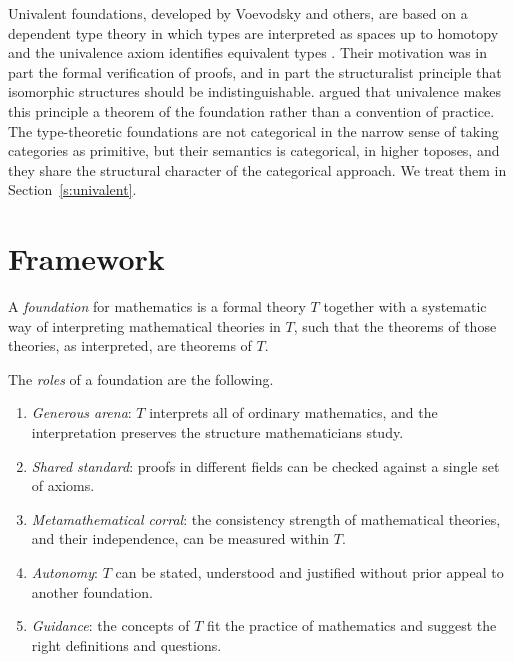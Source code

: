 \documentclass{situationist-preprint}
\begin{document}
Univalent foundations, developed by Voevodsky and others, are based on a dependent type theory in which types are interpreted as spaces up to homotopy and the univalence axiom identifies equivalent types \citep{UFP2013}. Their motivation was in part the formal verification of proofs, and in part the structuralist principle that isomorphic structures should be indistinguishable. \citet{Awodey2014} argued that univalence makes this principle a theorem of the foundation rather than a convention of practice. The type-theoretic foundations are not categorical in the narrow sense of taking categories as primitive, but their semantics is categorical, in higher toposes, and they share the structural character of the categorical approach. We treat them in Section~\ref{s:univalent}.

\section{Framework}\label{s:framework}

\begin{definition}\label{d:foundation}
A \emph{foundation} for mathematics is a formal theory $T$ together with a systematic way of interpreting mathematical theories in $T$, such that the theorems of those theories, as interpreted, are theorems of $T$.
\end{definition}

\begin{definition}\label{d:roles}
The \emph{roles} of a foundation are the following.
\begin{enumerate}[label=(\alph*)]
\item \emph{Generous arena}: $T$ interprets all of ordinary mathematics, and the interpretation preserves the structure mathematicians study.
\item \emph{Shared standard}: proofs in different fields can be checked against a single set of axioms.
\item \emph{Metamathematical corral}: the consistency strength of mathematical theories, and their independence, can be measured within $T$.
\item \emph{Autonomy}: $T$ can be stated, understood and justified without prior appeal to another foundation.
\item \emph{Guidance}: the concepts of $T$ fit the practice of mathematics and suggest the right definitions and questions.
\end{enumerate}
\end{definition}
\end{document}
